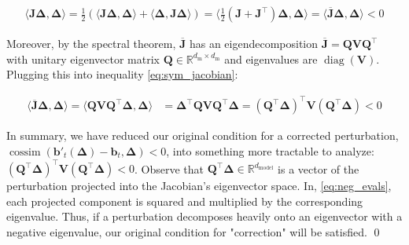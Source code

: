 \begin{align}
\langle \mathbf{J\Delta}, \mathbf{\Delta} \rangle = \frac{1}{2}\left(\langle \mathbf{J\Delta}, \mathbf{\Delta} \rangle + \langle \mathbf{\Delta}, \mathbf{J\Delta} \rangle\right) = \langle \frac{1}{2}(\mathbf{J} + \mathbf{J}^\top)\mathbf{\Delta}, \mathbf{\Delta} \rangle = \langle \mathbf{\overline{J}\Delta}, \mathbf{\Delta} \rangle < 0 \label{eq:sym_jacobian}
\end{align}

Moreover, by the spectral theorem, $\overline{\mathbf{J}}$ has an eigendecomposition $\overline{\mathbf{J}} = \mathbf{QVQ^\top}$ with unitary eigenvector matrix $\mathbf{Q} \in \mathbb{R}^{d_\text{m} \times d_\text{m}}$ and eigenvalues are $\operatorname{diag}(\mathbf{V})$. Plugging this into inequality \ref{eq:sym_jacobian}:

\begin{align}
\langle \overline{\mathbf{J}} \mathbf{\Delta}, \mathbf{\Delta} \rangle = \langle \mathbf{QVQ^\top} \mathbf{\Delta}, \mathbf{\Delta} \rangle &= \mathbf{\Delta}^\top \mathbf{QVQ^\top} \mathbf{\Delta} = (\mathbf{Q}^\top \mathbf{\Delta})^\top \mathbf{V} (\mathbf{Q}^\top \mathbf{\Delta}) < 0 \label{eq:neg_evals}
\end{align}

In summary, we have reduced our original condition for a corrected perturbation, $\operatorname{cossim}(\mathbf{b}'_t(\mathbf{\Delta}) - \mathbf{b}_t, \mathbf{\Delta}) < 0$, into something more tractable to analyze: $(\mathbf{Q}^\top \mathbf{\Delta})^\top \mathbf{V} (\mathbf{Q}^\top \mathbf{\Delta}) < 0$. Observe that $\mathbf{Q}^\top \mathbf{\Delta} \in \mathbb{R}^{d_\text{model}}$ is a vector of the perturbation projected into the Jacobian's eigenvector space. In, \ref{eq:neg_evals}, each projected component is squared and multiplied by the corresponding eigenvalue. Thus, if a perturbation decomposes heavily onto an eigenvector with a negative eigenvalue, our original condition for "correction" will be satisfied. \qed


